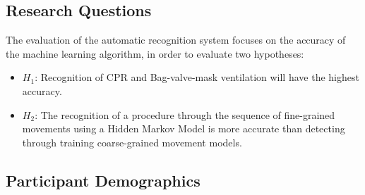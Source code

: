 \subsection{Research Questions}
\label{sec:Data-Collection:Research-Questions}
The evaluation of the automatic recognition system focuses on the accuracy of the machine learning algorithm, in order to evaluate two hypotheses:
\begin{itemize}
	\item $H_1$: Recognition of CPR and Bag-valve-mask ventilation will have the highest accuracy.
	\item $H_2$: The recognition of a procedure through the sequence of fine-grained movements using a Hidden Markov Model is more accurate than detecting through training coarse-grained movement models.
\end{itemize}

\subsection{Participant Demographics}
\label{sec:Data-Collection:Participant-Demographics}